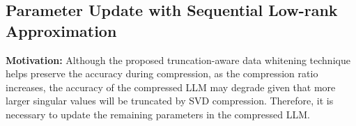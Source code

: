 
\subsection{Parameter Update with Sequential Low-rank Approximation}
\label{subsec:lora_finetunig}
\textbf{Motivation:} 
%
Although the proposed truncation-aware data whitening technique helps preserve the accuracy during compression, as the compression ratio increases, the accuracy of the compressed LLM may degrade given that more larger singular values will be truncated by SVD compression.
Therefore, it is necessary to update the remaining parameters in the compressed LLM.


